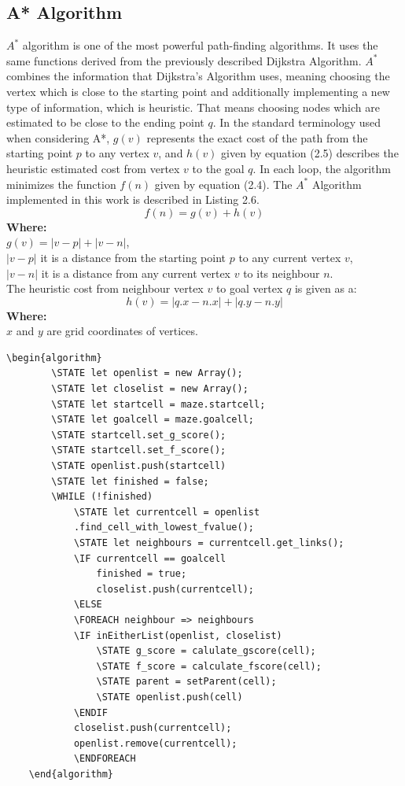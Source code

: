 \subsection{A* Algorithm}
$A^*$ algorithm is one of the most powerful path-finding algorithms. It uses the same functions derived from the previously described Dijkstra Algorithm. 
$A^*$ combines the information that Dijkstra’s Algorithm uses, meaning choosing the vertex which is close to the starting point and additionally
implementing a new type of information, which is heuristic. That means choosing nodes which are estimated to be close to the ending point $q$. 
In the standard terminology used when considering A*, $g(v)$ represents the exact cost of the path from the starting point $p$ to any vertex $v$, and
$h(v)$ given by equation (2.5) describes the heuristic estimated cost from vertex $v$ to the goal $q$. In each loop, the algorithm minimizes the function
$f(n)$ given by equation (2.4). The $A^*$ Algorithm implemented in this work is described in Listing 2.6.
\begin{equation}
f(n) = g(v) + h(v)
\end{equation}
\textbf{Where:}\\
$g(v)= |v - p| + |v - n|$,\\
$|v - p|$ it is a distance from the starting point $p$ to any current vertex $v$,\\
$|v - n|$ it is a distance from any current vertex $v$ to its neighbour $n$.\\
\newline
The heuristic cost from neighbour vertex $v$ to goal vertex $q$ is given as a:
\begin{equation}
h(v) = |q.x - n.x| + |q.y - n.y|
\end{equation}
\textbf{Where:}\\
$x$ and $y$ are grid coordinates of vertices.\\

\begin{lstlisting}[caption={Pseudocode for a A* algorithm. Source: developped by the author, based on~\cite{19}.}]
	\begin{algorithm}
		\STATE let openlist = new Array();
		\STATE let closelist = new Array();
		\STATE let startcell = maze.startcell;
		\STATE let goalcell = maze.goalcell;
		\STATE startcell.set_g_score();
		\STATE startcell.set_f_score();
		\STATE openlist.push(startcell)
		\STATE let finished = false;
		\WHILE (!finished)
			\STATE let currentcell = openlist    
			.find_cell_with_lowest_fvalue();
			\STATE let neighbours = currentcell.get_links();
			\IF currentcell == goalcell
				finished = true;
				closelist.push(currentcell);
			\ELSE 
			\FOREACH neighbour => neighbours	
			\IF inEitherList(openlist, closelist)
				\STATE g_score = calulate_gscore(cell);
				\STATE f_score = calculate_fscore(cell);
				\STATE parent = setParent(cell);
				\STATE openlist.push(cell)
			\ENDIF
			closelist.push(currentcell);
			openlist.remove(currentcell);
	    	\ENDFOREACH
	\end{algorithm}
	\end{lstlisting}
%